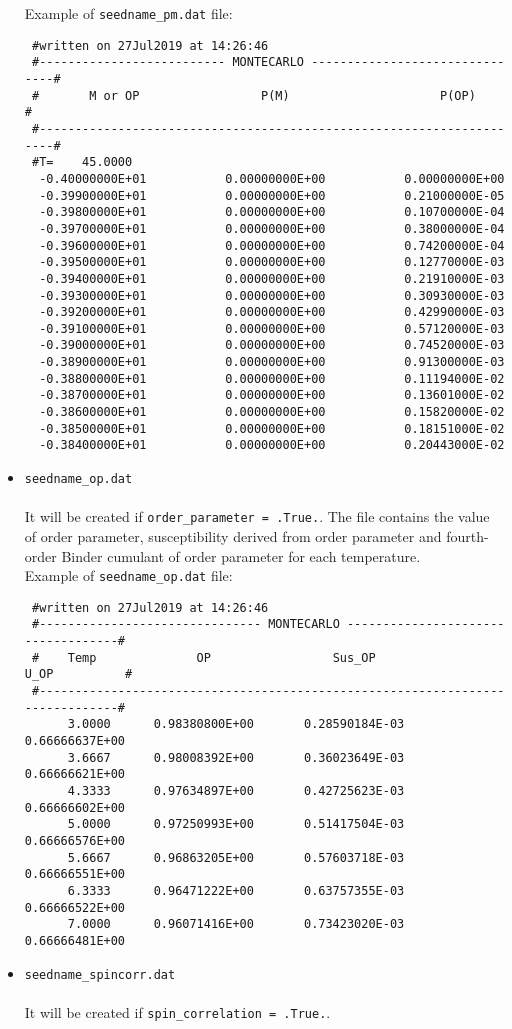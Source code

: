 \documentclass[10pt]{report}
\begin{document}
\begin{itemize}
 Example of {\tt seedname\_pm.dat}  file:
{\scriptsize    
\begin{verbatim}
 #written on 27Jul2019 at 14:26:46
 #-------------------------- MONTECARLO -------------------------------#
 #       M or OP                 P(M)                     P(OP)        #
 #---------------------------------------------------------------------#
 #T=    45.0000
  -0.40000000E+01           0.00000000E+00           0.00000000E+00
  -0.39900000E+01           0.00000000E+00           0.21000000E-05
  -0.39800000E+01           0.00000000E+00           0.10700000E-04
  -0.39700000E+01           0.00000000E+00           0.38000000E-04
  -0.39600000E+01           0.00000000E+00           0.74200000E-04
  -0.39500000E+01           0.00000000E+00           0.12770000E-03
  -0.39400000E+01           0.00000000E+00           0.21910000E-03
  -0.39300000E+01           0.00000000E+00           0.30930000E-03
  -0.39200000E+01           0.00000000E+00           0.42990000E-03
  -0.39100000E+01           0.00000000E+00           0.57120000E-03
  -0.39000000E+01           0.00000000E+00           0.74520000E-03
  -0.38900000E+01           0.00000000E+00           0.91300000E-03
  -0.38800000E+01           0.00000000E+00           0.11194000E-02
  -0.38700000E+01           0.00000000E+00           0.13601000E-02
  -0.38600000E+01           0.00000000E+00           0.15820000E-02
  -0.38500000E+01           0.00000000E+00           0.18151000E-02
  -0.38400000E+01           0.00000000E+00           0.20443000E-02
\end{verbatim}
}
\item {\tt seedname\_op.dat}\\\\
It will be created if {\tt order\_parameter = .True.}. The file contains the value of order
parameter, susceptibility derived from order parameter and 
fourth-order Binder cumulant of order parameter for each temperature.\\

 Example of {\tt seedname\_op.dat}  file:
{\scriptsize    
\begin{verbatim}
 #written on 27Jul2019 at 14:26:46 
 #------------------------------- MONTECARLO -----------------------------------#
 #    Temp              OP                 Sus_OP                 U_OP          #
 #------------------------------------------------------------------------------#
      3.0000      0.98380800E+00       0.28590184E-03        0.66666637E+00
      3.6667      0.98008392E+00       0.36023649E-03        0.66666621E+00
      4.3333      0.97634897E+00       0.42725623E-03        0.66666602E+00
      5.0000      0.97250993E+00       0.51417504E-03        0.66666576E+00
      5.6667      0.96863205E+00       0.57603718E-03        0.66666551E+00
      6.3333      0.96471222E+00       0.63757355E-03        0.66666522E+00
      7.0000      0.96071416E+00       0.73423020E-03        0.66666481E+00
\end{verbatim}
}
\item {\tt seedname\_spincorr.dat}\\\\
It will be created  if {\tt spin\_correlation = .True.}. \\



\end{itemize}
\end{document}
